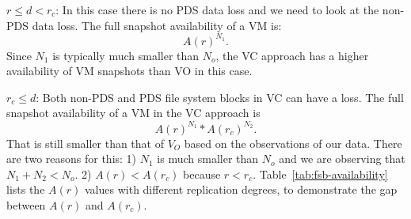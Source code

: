 \noindent $r \le d<r_c$:  In this case there is no PDS data loss and we need to look at the non-PDS data loss. 
The full snapshot availability of a VM is: 
\[
A(r)^{N_1}.
\]
Since $N_1$ is typically much smaller than $N_o$, 
the VC approach has a higher availability of VM snapshots than VO in this case.

\noindent $r_c \leq d$: Both non-PDS and PDS file system blocks in VC can have a loss.
The full snapshot availability of  a VM in the VC approach is
\[
A(r)^{N_1} * A(r_c)^{N_2}.
\]
That is still smaller than that of $V_O$ based on the observations of our data. There are two reasons for this:  
1) $N_1$ is much smaller than $N_o$ and we are observing that $N_1+N_2<N_o$. 
2)  $A(r) < A(r_c)$ because $r < r_c$.  
Table~\ref{tab:fsb-availability} lists the $A(r)$ values with
different replication degrees, to demonstrate the gap between  $A(r)$ and  $A(r_c)$.


